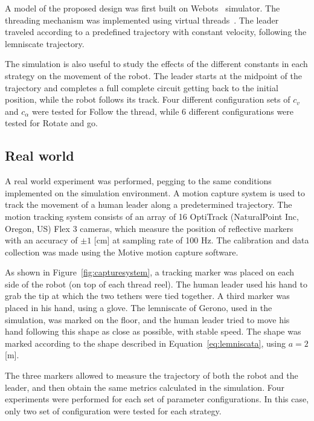 \documentclass[journal]{IEEEtran}
\begin{document}
A model of the proposed design was first built on Webots~\cite{Michel2004} simulator.  The threading mechanism was implemented using virtual threads~\cite{Rekleitis2001}.  The leader traveled according to a predefined trajectory with constant velocity, following the lemniscate trajectory.

The simulation is also useful to study the effects of the different constants in each strategy on the movement of the robot.  The leader starts at the midpoint of the trajectory and completes a full complete circuit getting back to the initial position, while the robot follows its track.  Four different configuration sets of $c_v$ and  $c_{\alpha}$ were tested for Follow the thread, while 6 different configurations were tested for Rotate and go.

\subsection{Real world}



A real world experiment was performed, pegging to the same conditions implemented on the simulation environment.  A motion capture system is used to track the movement of a human leader along a predetermined trajectory.   The motion tracking system consists of an array of 16 OptiTrack (NaturalPoint Inc, Oregon, US) Flex 3 cameras, which measure the position of reflective markers with an accuracy of $\pm1$ [cm] at sampling rate of 100 Hz. The calibration and data collection was made using the Motive motion capture software. 

As shown in Figure~\ref{fig:capturesystem}, a tracking marker was placed on each side of the robot (on top of each thread reel). The human leader used his hand to grab the tip at which the two tethers were tied together. A third marker was placed in his hand, using a glove. The lemniscate of Gerono, used in the simulation, was marked on the floor, and the human leader tried to move his hand following this shape as close as possible, with stable speed.  The shape was marked according to the shape described in Equation~\ref{eq:lemniscata}, using $a = 2$ [m].

The three markers allowed to measure the trajectory of both the robot and the leader, and then obtain the same metrics calculated in the simulation.  Four experiments were performed for each set of parameter configurations.  In this case, only two set of configuration were tested for each strategy.
\end{document}
